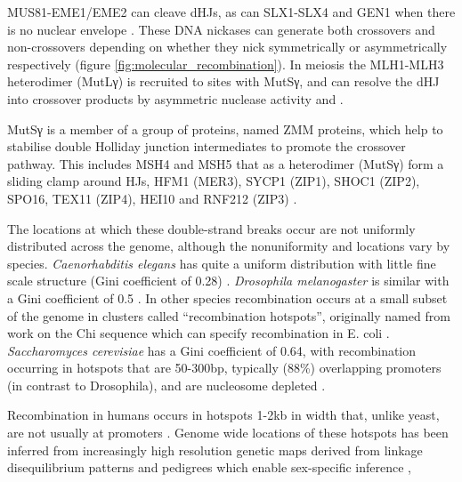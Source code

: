 MUS81-EME1/EME2 can cleave dHJs, as can SLX1-SLX4 and GEN1 when there is no nuclear envelope \parencite[reviewed in][]{Wyatt2014Holliday}.
These DNA nickases can generate both crossovers and non-crossovers depending on whether they nick symmetrically or asymmetrically respectively (figure \ref{fig:molecular_recombination}).
In meiosis the MLH1-MLH3 heterodimer (MutLγ) is recruited to sites with MutSγ, and can resolve the dHJ into crossover products by asymmetric nuclease activity \parencite{Zakharyevich2012Delineation} and \parencite[reviewed in][]{Hunter2015Meiotic, Gray2016Control, Manhart2016Roles, Toledo2019mutation}. 

MutSγ is a member of a group of proteins, named ZMM proteins, which help to stabilise double Holliday junction intermediates to promote the crossover pathway.
This includes MSH4 and MSH5 that as a heterodimer (MutSγ) form a sliding clamp around HJs, HFM1 (MER3), SYCP1 (ZIP1), SHOC1 (ZIP2), SPO16, TEX11 (ZIP4), HEI10 and RNF212 (ZIP3) \parencite[reviewed in][]{Pyatnitskaya2019Crossing}.


The locations at which these double-strand breaks occur are not uniformly distributed across the genome, although the nonuniformity and locations vary by species.
\textit{Caenorhabditis elegans} has quite a uniform distribution with little fine scale structure (Gini coefficient of 0.28) \parencite{Rockman2009Recombinational, Kaur2014Crossover}.
\textit{Drosophila melanogaster} is similar with a Gini coefficient of 0.5 \parencite{Chan2012GenomeWide, SmukowskiHeil2015Recombining}.
In other species recombination occurs at a small subset of the genome in clusters called ``recombination hotspots'', originally named from work on the Chi sequence which can specify recombination in E. coli \parencite{Lam1974RecMediated, Myers1994RecBC}.
\textit{Saccharomyces cerevisiae} has a Gini coefficient of 0.64, with recombination occurring in hotspots that are 50-300bp, typically (88\%) overlapping promoters (in contrast to Drosophila), and are nucleosome depleted \parencite{Baudat1997Clustering, Wu1994Meiosisinduced, Mancera2008Highresolution, Pan2011Hierarchical, Lam2015Nonparadoxical}.

Recombination in humans occurs in hotspots 1-2kb in width that, unlike yeast, are not usually at promoters \parencite{Jeffreys2001Intensely}.
Genome wide locations of these hotspots has been inferred from increasingly high resolution genetic maps derived from linkage disequilibrium patterns \parencite{McVean2004finescale, Myers2005FineScale, TheInternationalHapMapConsortium2007second, Coop2008HighResolution} and pedigrees which enable sex-specific inference \parencite{Kong2002highresolution, Kong2010Finescale, Kong2014Common, Bherer2017Refined, Halldorsson2019Characterizing},

